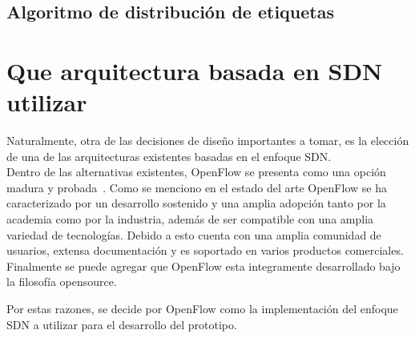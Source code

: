 \subsection{Algoritmo de distribución de etiquetas}


 
\section[Que arquitectura basada en SDN utilizar]{Que arquitectura basada en SDN utilizar}


 
Naturalmente, otra de las decisiones de dise\~no importantes a tomar, es la elecci\'on de una de las arquitecturas existentes basadas en el enfoque SDN.\\
  
Dentro de las alternativas existentes, OpenFlow se presenta como una opci\'on madura y probada~\citep{Ofelia}. Como se menciono en el estado del arte OpenFlow  se ha caracterizado por un desarrollo sostenido y una amplia adopci\'on tanto por la academia como por la industria, adem\'as de ser compatible con una amplia variedad de tecnolog\'ias. Debido a esto cuenta con una amplia comunidad de usuarios, extensa documentaci\'on y es soportado en varios productos comerciales\citep{Pica8}\citep{HP}\citep{Centec}\citep{SDNProductlist}. Finalmente se puede agregar que OpenFlow esta integramente desarrollado bajo la filosof\'ia opensource. 

Por estas razones, se decide por OpenFlow como la implementaci\'on del enfoque SDN a utilizar para el desarrollo del prototipo.\\






